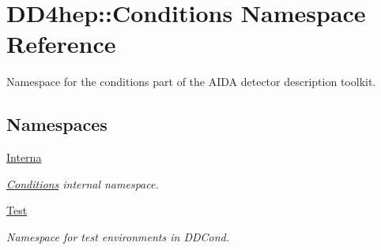 \hypertarget{namespace_d_d4hep_1_1_conditions}{}\section{D\+D4hep\+:\+:Conditions Namespace Reference}
\label{namespace_d_d4hep_1_1_conditions}


Namespace for the conditions part of the A\+I\+DA detector description toolkit.  


\subsection*{Namespaces}
\begin{DoxyCompactItemize}
\item 
 \hyperlink{namespace_d_d4hep_1_1_conditions_1_1_interna}{Interna}
\begin{DoxyCompactList}\small\item\em \hyperlink{namespace_d_d4hep_1_1_conditions}{Conditions} internal namespace. \end{DoxyCompactList}\item 
 \hyperlink{namespace_d_d4hep_1_1_conditions_1_1_test}{Test}
\begin{DoxyCompactList}\small\item\em Namespace for test environments in D\+D\+Cond. \end{DoxyCompactList}\end{DoxyCompactItemize}
